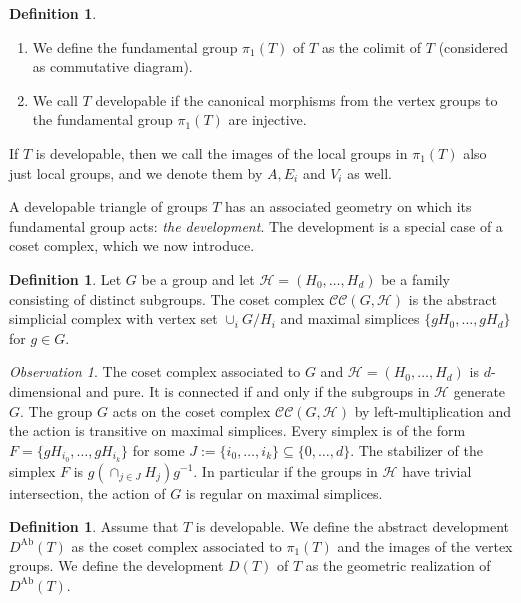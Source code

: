 \documentclass[dvipsnames]{article}
\theoremstyle{definition}
\newtheorem{definition}[theorem]{Definition}
\theoremstyle{remark}
\newtheorem{observation}[theorem]{Observation}
\DeclareMathOperator{\Ab}{Ab}
\begin{document}
    \begin{definition}
        \begin{enumerate}
            \item We define the fundamental group $\pi_1(T)$ of $T$ as the colimit of $T$ (considered as commutative diagram).
            \item We call $T$ developable if the canonical morphisms from the vertex groups to the fundamental group $\pi_1(T)$ are injective.
        \end{enumerate}
    \end{definition}

    If $T$ is developable, then we call the images of the local groups in $\pi_1(T)$ also just local groups, and we denote them by $A, E_i$ and $V_i$ as well.

    A developable triangle of groups $T$ has an associated geometry on which its fundamental group acts: \textit{the development}. The development is a special case of a coset complex, which we now introduce.

    \begin{definition}
        Let $G$ be a group and let $\mathcal H =(H_0, \dots, H_d)$ be a family consisting of distinct subgroups. The coset complex $\mathcal{CC}(G, \mathcal H)$ is the abstract simplicial complex with vertex set $\cup_i G/H_i$ and maximal simplices $\{gH_0, \dots, g H_d\}$ for $g \in G$. 
    \end{definition}

    \begin{observation}
        The coset complex associated to $G$ and $\mathcal H =(H_0, \dots, H_d)$ is $d$-dimensional and pure. It is connected if and only if the subgroups in $\mathcal H$ generate $G$.
        The group $G$ acts on the coset complex $\mathcal{CC}(G, \mathcal H)$ by left-multiplication and the action is transitive on maximal simplices. Every simplex is of the form $F = \{g H_{i_0}, \dots, g H_{i_k}\}$ for some $J :=\{i_0, \dots, i_k\} \subseteq \{0, \dots, d\}$. The stabilizer of the simplex $F$ is $g(\cap_{j\in J} H_{j}) g^{-1}$. In particular if the groups in $\mathcal H$ have trivial intersection, the action of $G$ is regular on maximal simplices.
    \end{observation}    

    \begin{definition}
        Assume that $T$ is developable.
        We define the abstract development $D^{\Ab}(T)$ as the coset complex associated to $\pi_1(T)$ and the images of the vertex groups.
        We define the development $D(T)$ of $T$ as the geometric realization of $D^{\Ab}(T)$.
    \end{definition}
\end{document}
